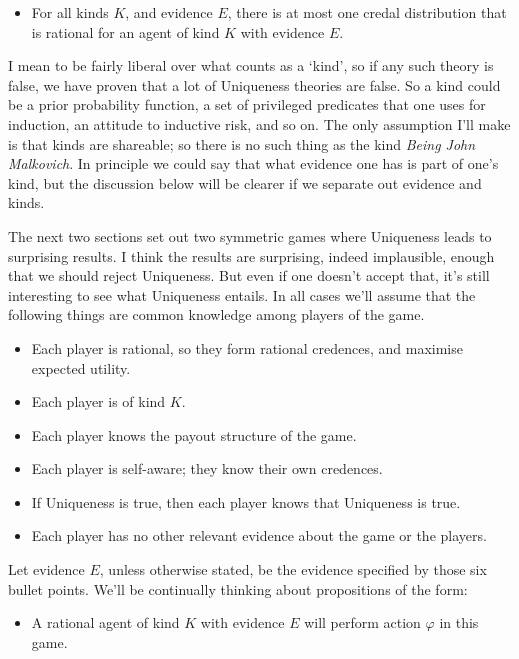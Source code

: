 \documentclass[12pt,]{article}
\providecommand{\tightlist}{%
  \setlength{\itemsep}{0pt}\setlength{\parskip}{0pt}}
\begin{document}
\begin{itemize}
\tightlist
\item
  For all kinds \(K\), and evidence \(E\), there is at most one credal distribution that is rational for an agent of kind \(K\) with evidence \(E\).
\end{itemize}

I mean to be fairly liberal over what counts as a `kind', so if any such theory is false, we have proven that a lot of Uniqueness theories are false. So a kind could be a prior probability function, a set of privileged predicates that one uses for induction, an attitude to inductive risk, and so on. The only assumption I'll make is that kinds are shareable; so there is no such thing as the kind \emph{Being John Malkovich}. In principle we could say that what evidence one has is part of one's kind, but the discussion below will be clearer if we separate out evidence and kinds.

The next two sections set out two symmetric games where Uniqueness leads to surprising results. I think the results are surprising, indeed implausible, enough that we should reject Uniqueness. But even if one doesn't accept that, it's still interesting to see what Uniqueness entails. In all cases we'll assume that the following things are common knowledge among players of the game.

\begin{itemize}
\tightlist
\item
  Each player is rational, so they form rational credences, and maximise expected utility.
\item
  Each player is of kind \(K\).
\item
  Each player knows the payout structure of the game.
\item
  Each player is self-aware; they know their own credences.
\item
  If Uniqueness is true, then each player knows that Uniqueness is true.
\item
  Each player has no other relevant evidence about the game or the players.
\end{itemize}

Let evidence \(E\), unless otherwise stated, be the evidence specified by those six bullet points. We'll be continually thinking about propositions of the form:

\begin{itemize}
\tightlist
\item
  A rational agent of kind \(K\) with evidence \(E\) will perform action \(\varphi\) in this game.
\end{itemize}
\end{document}
